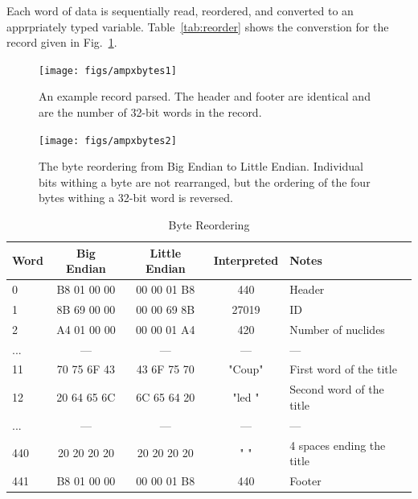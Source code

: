 Each word of data is sequentially read, reordered, and converted to an apprpriately typed variable. Table~\ref{tab:reorder} shows the converstion for the record given in Fig.~\ref{fig:ampxbytes1}.

\begin{figure}[tb]
  \begin{center}
   \texttt{[image: figs/ampxbytes1]}
  \end{center}
  \caption{An example record parsed. The header and footer are identical and are the number of 32-bit words in the record.}
\label{fig:ampxbytes1}
\end{figure}

\begin{figure}[tb]
  \begin{center}
   \texttt{[image: figs/ampxbytes2]}
  \end{center}
  \caption{The byte reordering from Big Endian to Little Endian. Individual bits withing a byte are not rearranged, but the ordering of the four bytes withing a 32-bit word is reversed.}
\label{fig:ampxbytes2}
\end{figure}

\begin{table}[ht]
\caption{Byte Reordering}
\centering 
\begin{tabular}{l | c | c | c | l}
  \hline \hline   
  Word  & Big Endian & Little Endian & Interpreted & Notes\\ [0.5ex] %
  \hline
  0   & B8 01 00 00 & 00 00 01 B8 & 440    & Header                    \\
  1   & 8B 69 00 00 & 00 00 69 8B & 27019  & ID                        \\
  2   & A4 01 00 00 & 00 00 01 A4 & 420    & Number of nuclides        \\
  ... &      ---    &      ---    &    --- & ---                       \\
  11  & 70 75 6F 43 & 43 6F 75 70 & "Coup" & First word of the title   \\
  12  & 20 64 65 6C & 6C 65 64 20 & "led " & Second word of the title  \\
  ... &     ---     &    ---      &  ---   & ---                       \\
  440 & 20 20 20 20 & 20 20 20 20 & "    " & 4 spaces ending the title \\
  441 & B8 01 00 00 & 00 00 01 B8 & 440    & Footer                    \\ 
  [1ex]      %
  \hline
\end{tabular}
\label{table:reorder}
\end{table}

